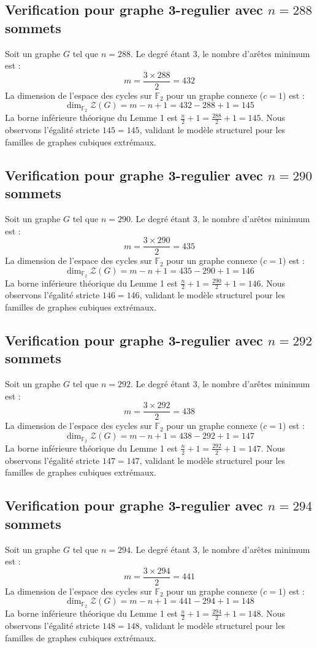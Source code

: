\documentclass[11pt,a4paper]{article}
\begin{document}
\subsection{Verification pour graphe 3-regulier avec $n=288$ sommets}
Soit un graphe $G$ tel que $n = 288$. Le degré étant 3, le nombre d'arêtes minimum est :
$$ m = \frac{3 \times 288}{2} = 432 $$
La dimension de l'espace des cycles sur $\mathbb{F}_2$ pour un graphe connexe ($c=1$) est :
$$ \dim_{\mathbb{F}_2} \mathcal{Z}(G) = m - n + 1 = 432 - 288 + 1 = 145 $$
La borne inférieure théorique du Lemme 1 est $\frac{n}{2} + 1 = \frac{288}{2} + 1 = 145$.
Nous observons l'égalité stricte $145 = 145$, validant le modèle structurel pour les familles de graphes cubiques extrémaux.

\subsection{Verification pour graphe 3-regulier avec $n=290$ sommets}
Soit un graphe $G$ tel que $n = 290$. Le degré étant 3, le nombre d'arêtes minimum est :
$$ m = \frac{3 \times 290}{2} = 435 $$
La dimension de l'espace des cycles sur $\mathbb{F}_2$ pour un graphe connexe ($c=1$) est :
$$ \dim_{\mathbb{F}_2} \mathcal{Z}(G) = m - n + 1 = 435 - 290 + 1 = 146 $$
La borne inférieure théorique du Lemme 1 est $\frac{n}{2} + 1 = \frac{290}{2} + 1 = 146$.
Nous observons l'égalité stricte $146 = 146$, validant le modèle structurel pour les familles de graphes cubiques extrémaux.

\subsection{Verification pour graphe 3-regulier avec $n=292$ sommets}
Soit un graphe $G$ tel que $n = 292$. Le degré étant 3, le nombre d'arêtes minimum est :
$$ m = \frac{3 \times 292}{2} = 438 $$
La dimension de l'espace des cycles sur $\mathbb{F}_2$ pour un graphe connexe ($c=1$) est :
$$ \dim_{\mathbb{F}_2} \mathcal{Z}(G) = m - n + 1 = 438 - 292 + 1 = 147 $$
La borne inférieure théorique du Lemme 1 est $\frac{n}{2} + 1 = \frac{292}{2} + 1 = 147$.
Nous observons l'égalité stricte $147 = 147$, validant le modèle structurel pour les familles de graphes cubiques extrémaux.

\subsection{Verification pour graphe 3-regulier avec $n=294$ sommets}
Soit un graphe $G$ tel que $n = 294$. Le degré étant 3, le nombre d'arêtes minimum est :
$$ m = \frac{3 \times 294}{2} = 441 $$
La dimension de l'espace des cycles sur $\mathbb{F}_2$ pour un graphe connexe ($c=1$) est :
$$ \dim_{\mathbb{F}_2} \mathcal{Z}(G) = m - n + 1 = 441 - 294 + 1 = 148 $$
La borne inférieure théorique du Lemme 1 est $\frac{n}{2} + 1 = \frac{294}{2} + 1 = 148$.
Nous observons l'égalité stricte $148 = 148$, validant le modèle structurel pour les familles de graphes cubiques extrémaux.
\end{document}
